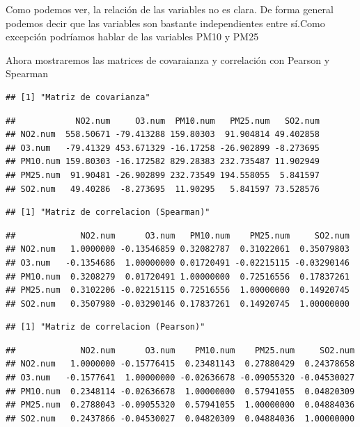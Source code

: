 \documentclass[notspecified,article,submit,moreauthors,pdftex]{Definitions/mdpi}
\begin{document}
Como podemos ver, la relación de las variables no es clara. De forma
general podemos decir que las variables son bastante independientes
entre sí.Como excepción podríamos hablar de las variables PM10 y PM25

Ahora mostraremos las matrices de covaraianza y correlación con Pearson
y Spearman

\begin{verbatim}
## [1] "Matriz de covarianza"
\end{verbatim}

\begin{verbatim}
##            NO2.num     O3.num  PM10.num   PM25.num   SO2.num
## NO2.num  558.50671 -79.413288 159.80303  91.904814 49.402858
## O3.num   -79.41329 453.671329 -16.17258 -26.902899 -8.273695
## PM10.num 159.80303 -16.172582 829.28383 232.735487 11.902949
## PM25.num  91.90481 -26.902899 232.73549 194.558055  5.841597
## SO2.num   49.40286  -8.273695  11.90295   5.841597 73.528576
\end{verbatim}

\begin{verbatim}
## [1] "Matriz de correlacion (Spearman)"
\end{verbatim}

\begin{verbatim}
##             NO2.num      O3.num   PM10.num    PM25.num     SO2.num
## NO2.num   1.0000000 -0.13546859 0.32082787  0.31022061  0.35079803
## O3.num   -0.1354686  1.00000000 0.01720491 -0.02215115 -0.03290146
## PM10.num  0.3208279  0.01720491 1.00000000  0.72516556  0.17837261
## PM25.num  0.3102206 -0.02215115 0.72516556  1.00000000  0.14920745
## SO2.num   0.3507980 -0.03290146 0.17837261  0.14920745  1.00000000
\end{verbatim}

\begin{verbatim}
## [1] "Matriz de correlacion (Pearson)"
\end{verbatim}

\begin{verbatim}
##             NO2.num      O3.num    PM10.num    PM25.num     SO2.num
## NO2.num   1.0000000 -0.15776415  0.23481143  0.27880429  0.24378658
## O3.num   -0.1577641  1.00000000 -0.02636678 -0.09055320 -0.04530027
## PM10.num  0.2348114 -0.02636678  1.00000000  0.57941055  0.04820309
## PM25.num  0.2788043 -0.09055320  0.57941055  1.00000000  0.04884036
## SO2.num   0.2437866 -0.04530027  0.04820309  0.04884036  1.00000000
\end{verbatim}
\end{document}
